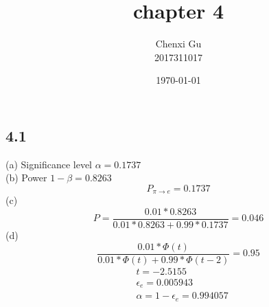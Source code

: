 \documentclass{article}
\begin{document}
\begin{CJK*}{GBK}{song}

\pagestyle{fancy}  
\fancyhead{} %
\renewcommand{\headrulewidth}{0.4pt}  
\renewcommand{\footrulewidth}{0.4pt} 



\title {chapter 4}
\author{Chenxi Gu\\2017311017}

\date{\today}

\maketitle
\section{4.1}
(a)
Significance level $\alpha=0.1737$\\
(b)
Power $1-\beta=0.8263$\\
\begin{equation}
P_{\pi\rightarrow e}=0.1737
\end{equation}
(c)
\begin{equation}
P=\frac{0.01*0.8263}{0.01*0.8263+0.99*0.1737}=0.046
\end{equation}
(d)
\begin{equation}
\frac{0.01*\Phi(t)}{0.01*\Phi(t)+0.99*\Phi(t-2)}=0.95
\end{equation}
\begin{equation}
\begin{aligned}
&t=-2.5155\\
&\epsilon_e=0.005943\\
&\alpha=1-\epsilon_e=0.994057
\end{aligned}
\end{equation}


\end{CJK*}
\end{document}
